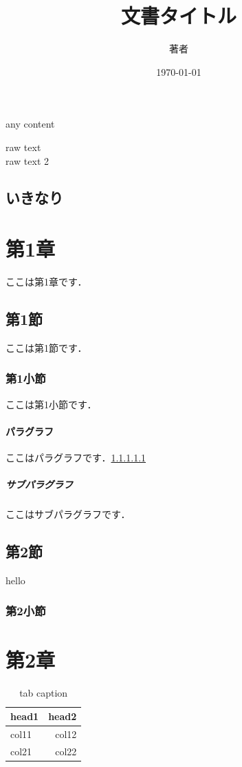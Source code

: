 \documentclass[a4paper,11pt]{jarticle}
\title{文書タイトル}
\author{著者}
\date{\today}
\begin{document}
    \maketitle

    \clearpage
    \tableofcontents

    \begin{table}
        any content
    \end{table}

    \clearpage\clearpage raw text\\
    raw text 2
    \subsection{いきなり}
    \cleardoublepage
    \section{第1章}
        ここは第1章です．
        \subsection{第1節}
            ここは第1節です．
            \subsubsection{第1小節}
                ここは第1小節です．
                \paragraph{パラグラフ}
                    ここはパラグラフです．\ref{sec:subparagraph}
                    \subparagraph{サブパラグラフ}
                        \label{sec:subparagraph}
                        ここはサブパラグラフです．
        \subsection{第2節}hello\subsubsection{第2小節}\quad

    \cleardoublepage
    \section{第2章}
        \begin{table}[h]
            \centering
            \caption{tab caption}
            \begin{tabular}{lr} \hline
                head1 & head2 \\\hline
                col11 & col12 \\
                col21 & col22 \\\hline
            \end{tabular}
            \label{tab:table}
        \end{table}
\end{document}
